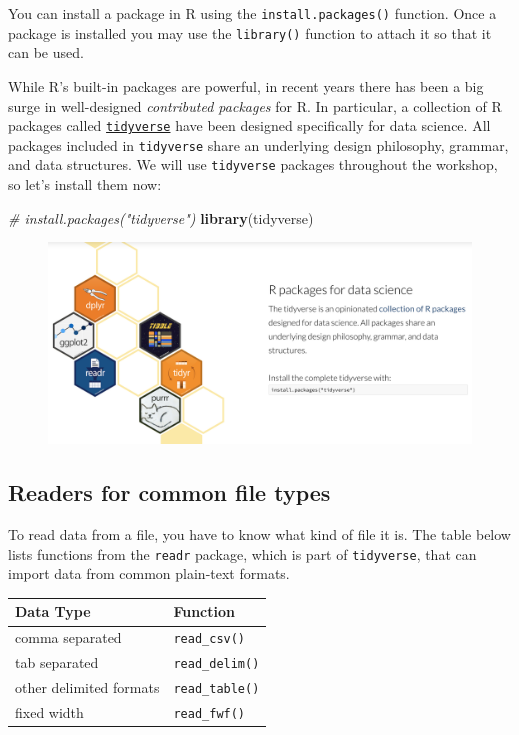 \documentclass[]{book}
\newenvironment{Shaded}{\begin{snugshade}}{\end{snugshade}}
\newcommand{\KeywordTok}[1]{\textcolor[rgb]{0.13,0.29,0.53}{\textbf{#1}}}
\newcommand{\CommentTok}[1]{\textcolor[rgb]{0.56,0.35,0.01}{\textit{#1}}}
\newcommand{\NormalTok}[1]{#1}
\begin{document}
You can install a package in R using the \texttt{install.packages()}
function. Once a package is installed you may use the \texttt{library()}
function to attach it so that it can be used.

While R's built-in packages are powerful, in recent years there has been
a big surge in well-designed \emph{contributed packages} for R. In
particular, a collection of R packages called
\href{https://www.tidyverse.org/}{\texttt{tidyverse}} have been designed
specifically for data science. All packages included in
\texttt{tidyverse} share an underlying design philosophy, grammar, and
data structures. We will use \texttt{tidyverse} packages throughout the
workshop, so let's install them now:

\begin{Shaded}
\begin{Highlighting}[]
\CommentTok{# install.packages("tidyverse")}
\KeywordTok{library}\NormalTok{(tidyverse)}
\end{Highlighting}
\end{Shaded}

\begin{figure}
\centering
\includegraphics{R/Rintro/images/tidyverse.png}
\caption{}
\end{figure}

\subsection{Readers for common file
types}\label{readers-for-common-file-types}

To read data from a file, you have to know what kind of file it is. The
table below lists functions from the \texttt{readr} package, which is
part of \texttt{tidyverse}, that can import data from common plain-text
formats.

\begin{longtable}[]{@{}ll@{}}
\toprule
Data Type & Function\tabularnewline
\midrule
\endhead
comma separated & \texttt{read\_csv()}\tabularnewline
tab separated & \texttt{read\_delim()}\tabularnewline
other delimited formats & \texttt{read\_table()}\tabularnewline
fixed width & \texttt{read\_fwf()}\tabularnewline
\bottomrule
\end{longtable}
\end{document}
